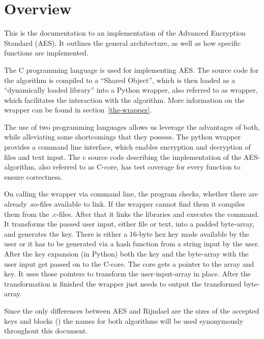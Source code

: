 \hypertarget{overview}{%
\chapter{Overview}\label{overview}}

This is the documentation to an implementation of the Advanced Encryption Standard (AES). It outlines the general architecture, as well as how specific functions are implemented.

The C programming language is used for implementing
AES. The source code for the algorithm is compiled to a ``Shared
Object'', which is then loaded as a ``dynamically loaded library'' into
a Python wrapper, also referred to as wrapper, which facilitates the
interaction with the algorithm. More information on the wrapper can be found in section~\ref{the-wrapper}.

The use of two programming languages allows us leverage the advantages
of both, while alleviating some shortcomings that they possess. The
python wrapper provides a command line interface, which enables
encryption and decryption of files and text input. The c source code
describing the implementation of the AES-algorithm, also referred to as
C-core, has test coverage for every function to ensure correctness.

On calling the wrapper via command line, the program checks,
whether there are already .so-files available to link. If the wrapper
cannot find them it compiles them from the .c-files. After that it links
the libraries and executes the command. It transforms the passed user
input, either file or text, into a padded byte-array, and generates the
key. There is either a 16-byte hex key made available by the user or it
has to be generated via a hash function from a string input by the user.
After the key expansion (in Python) both the key and the byte-array with
the user input get passed on to the C-core. The core gets a pointer to
the array and key. It uses those pointers to transform the
user-input-array in place. After the transformation is finished the
wrapper just needs to output the transformed byte-array.

Since the only differences between AES and Rijndael are the sizes of the
accepted keys and blocks (\cite[p. 31]{rijndael}) the names for both algorithms
will be used synonymously throughout this document.
